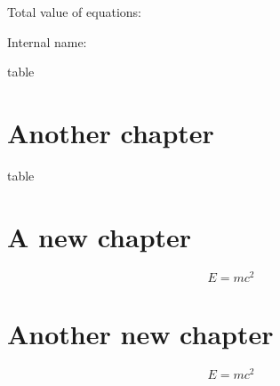 \documentclass{book}
\begin{document}
Total value of equations: 

Internal name: 

\begin{table}
\caption{table}
\end{table}




\chapter{Another chapter}




\begin{table}
\caption{table}
\end{table}



\chapter{A new chapter}

\begin{equation}
  E=mc^2
\end{equation}

\chapter{Another new chapter}

\begin{equation}
  E=mc^2
\end{equation}
\end{document}
